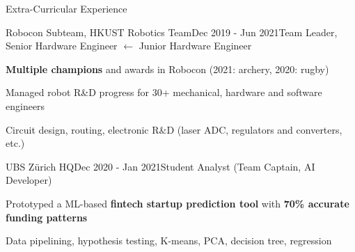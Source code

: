 \documentclass{resume}
\begin{document}
\begin{rSection}{Extra-Curricular Experience}
    
    
    \begin{rSubsection}{Robocon Subteam, HKUST Robotics Team}{Dec 2019 - Jun 2021}{Team Leader, Senior Hardware Engineer $\leftarrow$ Junior Hardware Engineer}{}
        \item \textbf{Multiple champions} and awards in Robocon (2021: archery, 2020: rugby)
        \item Managed robot R\&D progress for 30+ mechanical, hardware and software engineers
        \item Circuit design, routing, electronic R\&D (laser ADC, regulators and converters, etc.)
    \end{rSubsection}

    \begin{rSubsection}{UBS Zürich HQ}{Dec 2020 - Jan 2021}{Student Analyst (Team Captain, AI Developer)}{}
        \item Prototyped a ML-based \textbf{fintech startup prediction tool} with \textbf{70\% accurate funding patterns}
        \item Data pipelining, hypothesis testing, K-means, PCA, decision tree, regression
    \end{rSubsection}

\end{rSection}
\end{document}
